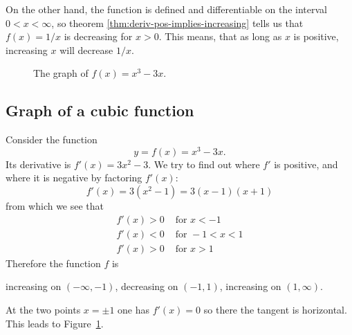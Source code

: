 On the other hand, the function is defined and differentiable on the interval
$0<x<\infty$, so theorem \ref{thm:deriv-pos-implies-increasing} tells us that
$f(x) = 1/x$ is decreasing for $x>0$.  This means, that as long as $x$ is
positive, increasing $x$ will decrease $1/x$.




\begin{figure}[t]
  \centering 




  \bigskip




  \caption{The graph of $f(x) = x^3-3x$.}
  \label{fig:05upAndDown}
\end{figure}




\subsection{Graph of a cubic function} %
\label{sec:cubicgraph}
Consider the function
\[
y = f(x) = x^3-3x.
\]
Its derivative is $f'(x) = 3x^2-3$.  We try to find out where $f'$ is positive,
and where it is negative by factoring $f'(x)$:
\[
f'(x) = 3(x^2-1)
=3(x-1)(x+1)
\]
from which we see that
\begin{align*}
  f'(x) > 0 &\text{ for }x<-1 \\
  f'(x) < 0 &\text{ for }-1 < x < 1 \\
  f'(x) > 0 &\text{ for } x>1
\end{align*}
Therefore the function $f$ is
\begin{center}
  increasing on $(-\infty, -1)$, \quad decreasing on
  $(-1, 1)$, \quad increasing on
  $(1, \infty)$.
\end{center}
At the two points $x=\pm1$ one has $f'(x)=0$ so there the tangent
is horizontal.  This leads to Figure~\ref{fig:05upAndDown}.




